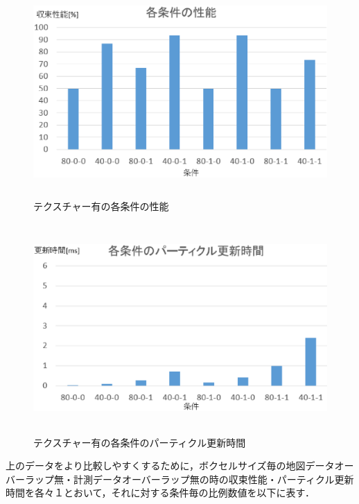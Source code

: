 %
\begin{figure}[htbp]
  \begin{center}
   \includegraphics[height=80mm]{figure/各条件の性能2.eps}
   \caption{テクスチャー有の各条件の性能}
   \label{各条件の性能}
  \end{center}
\end{figure}
%

%
\begin{figure}[htbp]
  \begin{center}
   \includegraphics[height=80mm]{figure/各条件のパーティクル更新時間2.eps}
   \caption{テクスチャー有の各条件のパーティクル更新時間}
   \label{各条件のパーティクル更新時間}
  \end{center}
\end{figure}
%

\newpage
上のデータをより比較しやすくするために，ボクセルサイズ毎の地図データオーバーラップ無・計測データオーバーラップ無の時の収束性能・パーティクル更新時間を各々１とおいて，それに対する条件毎の比例数値を以下に表す．

